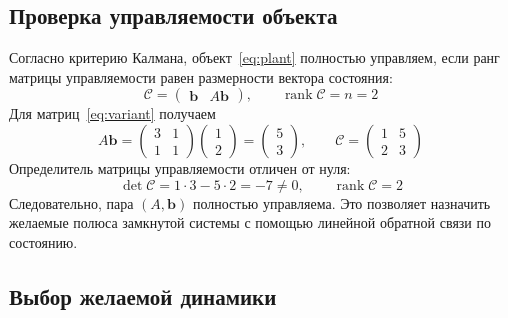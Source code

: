 \subsection{Проверка управляемости объекта}

Согласно критерию Калмана, объект~\eqref{eq:plant} полностью управляем,
если ранг матрицы управляемости равен размерности вектора состояния:
\begin{equation}
  \mathcal C=\begin{pmatrix}\bm b&A\bm b\end{pmatrix},
  \qquad \operatorname{rank}\mathcal C=n=2
  \label{eq:controllability}
\end{equation}
Для матриц~\eqref{eq:variant} получаем
\begin{equation}
  A\bm b=
  \begin{pmatrix}3&1\\1&1\end{pmatrix}
  \begin{pmatrix}1\\2\end{pmatrix}
  =\begin{pmatrix}5\\3\end{pmatrix},
  \qquad
  \mathcal C=\begin{pmatrix}1&5\\2&3\end{pmatrix}
  \label{eq:controllability-numeric}
\end{equation}
Определитель матрицы управляемости отличен от нуля:
\begin{equation}
  \det\mathcal C=1\cdot3-5\cdot2=-7\ne0,
  \qquad \operatorname{rank}\mathcal C=2
  \label{eq:controllability-rank}
\end{equation}
Следовательно, пара $(A,\bm b)$ полностью управляема. Это позволяет
назначить желаемые полюса замкнутой системы с помощью линейной
обратной связи по состоянию.

\subsection{Выбор желаемой динамики}

